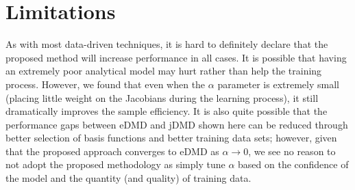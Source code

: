 \documentclass{article}
\begin{document}
      
      \section{Limitations} \label{sec:limitations}
      As with most data-driven techniques, it is hard to definitely declare that the proposed 
      method will increase performance in all cases. It is possible that having an extremely poor
      analytical model may hurt rather than help the training process. However, we found that even
      when the $\alpha$ parameter is extremely small (placing little weight on the Jacobians 
      during the learning process), it still dramatically improves the sample efficiency. It is 
      also quite possible that the performance gaps between eDMD and jDMD shown here can be 
      reduced through better selection of basis functions and better training data sets; however,
      given that the proposed approach converges to eDMD as $\alpha \rightarrow 0$, we see no 
      reason to not adopt the proposed methodology as simply tune $\alpha$ based on the 
      confidence of the model and the quantity (and quality) of training data.
      
      
\end{document}
